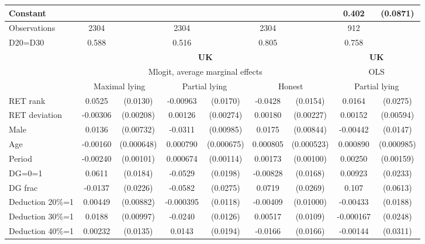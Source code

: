 \begin{tabular}{l|cccccc|cc}
Constant        &                  &         &                  &         &                  &         &    0.402\sym{***}& (0.0871)\\
\hline
Observations    &     2304         &         &     2304         &         &     2304         &         &      912         &         \\
D20=D30         &    0.588         &         &    0.516         &         &    0.805         &         &    0.758         &         \\
\hline\hline
&\multicolumn{6}{c|}{\bf UK}&\multicolumn{2}{c}{\bf UK}\\ &\multicolumn{6}{c|}{Mlogit, average marginal effects }&\multicolumn{2}{c}{OLS}\\
                &\multicolumn{2}{c}{Maximal lying}&\multicolumn{2}{c}{Partial lying}&\multicolumn{2}{c}{Honest}  &\multicolumn{2}{c}{Partial lying}\\
\hline
RET rank        &   0.0525\sym{***}& (0.0130)& -0.00963         & (0.0170)&  -0.0428\sym{***}& (0.0154)&   0.0164         & (0.0275)\\
RET deviation   & -0.00306         &(0.00208)&  0.00126         &(0.00274)&  0.00180         &(0.00227)&  0.00152         &(0.00594)\\
Male            &   0.0136\sym{*}  &(0.00732)&  -0.0311\sym{***}&(0.00985)&   0.0175\sym{**} &(0.00844)& -0.00442         & (0.0147)\\
Age             & -0.00160\sym{**} &(0.000648)& 0.000790         &(0.000675)& 0.000805         &(0.000523)& 0.000890         &(0.000985)\\
Period          & -0.00240\sym{**} &(0.00101)& 0.000674         &(0.00114)&  0.00173\sym{*}  &(0.00100)&  0.00250         &(0.00159)\\
DG=0=1          &   0.0611\sym{***}& (0.0184)&  -0.0529\sym{***}& (0.0198)& -0.00828         & (0.0168)&  0.00923         & (0.0233)\\
DG frac         &  -0.0137         & (0.0226)&  -0.0582\sym{**} & (0.0275)&   0.0719\sym{***}& (0.0269)&    0.107\sym{*}  & (0.0613)\\
Deduction 20\%=1&  0.00449         &(0.00882)&-0.000395         & (0.0118)& -0.00409         &(0.01000)& -0.00433         & (0.0188)\\
Deduction 30\%=1&   0.0188\sym{*}  &(0.00997)&  -0.0240\sym{*}  & (0.0126)&  0.00517         & (0.0109)&-0.000167         & (0.0248)\\
Deduction 40\%=1&  0.00232         & (0.0135)&   0.0143         & (0.0194)&  -0.0166         & (0.0166)& -0.00144         & (0.0311)\\

\end{tabular}
